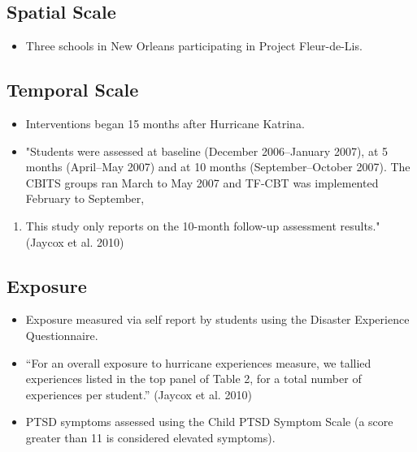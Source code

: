 \documentclass[
]{article}
\providecommand{\tightlist}{%
  \setlength{\itemsep}{0pt}\setlength{\parskip}{0pt}}
\begin{document}
\hypertarget{spatial-scale-7}{%
\subsection{Spatial Scale}\label{spatial-scale-7}}

\begin{itemize}
\tightlist
\item
  Three schools in New Orleans participating in Project Fleur-de-Lis.
\end{itemize}

\hypertarget{temporal-scale-4}{%
\subsection{Temporal Scale}\label{temporal-scale-4}}

\begin{itemize}
\tightlist
\item
  Interventions began 15 months after Hurricane Katrina.
\item
  "Students were assessed at baseline (December 2006--January 2007), at
  5 months (April--May 2007) and at 10 months (September--October 2007).
  The CBITS groups ran March to May 2007 and TF-CBT was implemented
  February to September,
\end{itemize}

\begin{enumerate}
\def\labelenumi{\arabic{enumi}.}
\setcounter{enumi}{2006}
\tightlist
\item
  This study only reports on the 10-month follow-up assessment
  results."(Jaycox et al. 2010)
\end{enumerate}

\hypertarget{exposure-1}{%
\subsection{Exposure}\label{exposure-1}}

\begin{itemize}
\tightlist
\item
  Exposure measured via self report by students using the Disaster
  Experience Questionnaire.
\item
  ``For an overall exposure to hurricane experiences measure, we tallied
  experiences listed in the top panel of Table 2, for a total number of
  experiences per student.'' (Jaycox et al. 2010)
\item
  PTSD symptoms assessed using the Child PTSD Symptom Scale (a score
  greater than 11 is considered elevated symptoms).
\end{itemize}
\end{document}

